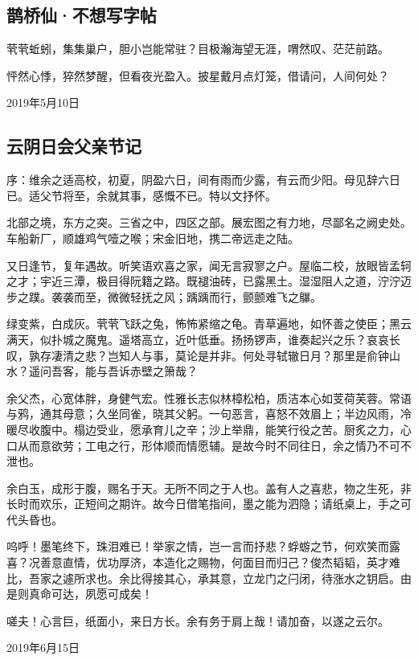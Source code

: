 \documentclass[a5paper]{ctexart}
\begin{document}
	\subsection{鹊桥仙·不想写字帖}
	茕茕蚯蚓，集集巢户，胆小岂能常驻？目极瀚海望无涯，喟然叹、茫茫前路。
	
	怦然心悸，猝然梦醒，但看夜光盈入。披星戴月点灯笼，借请问，人间何处？
	\begin{flushright}
		2019年5月10日 
	\end{flushright}
	
	\subsection{云阴日会父亲节记}
	\begin{small}
		序：维余之适高校，初夏，阴盈六日，间有雨而少露，有云而少阳。母见辞六日已。适父节将至，余就其事，感慨不已。特以文抒怀。
	\end{small}
	
	北部之境，东方之突。三省之中，四区之部。展宏图之有力地，尽鄙名之阙史处。车船新厂，顺雄鸡气噎之喉；宋金旧地，携二帝远走之陆。
	
	又日逢节，复年遇故。听笑语欢喜之家，闻无言寂寥之户。屋临二校，放眼皆孟轲之才；宇近三潭，极目得阮籍之路。既褪油砖，已露黑土。湿湿阻人之道，泞泞迈步之蹼。袭袭而至，微微轻抚之风；踽踽而行，颤颤难飞之鸔。
	
	绿变紫，白成灰。茕茕飞跃之兔，怖怖紧缩之龟。青草遍地，如怀善之使臣；黑云满天，似扑城之魔鬼。遥塔高立，近叶低垂。扬扬锣声，谁奏起兴之乐？哀哀长叹，孰存凄清之悲？岂知人与事，莫论是并非。何处寻轼辙日月？那里是俞钟山水？遥问吾客，能与吾诉赤壁之箫哉？
	
	余父杰，心宽体胖，身健气宏。性雅长志似林樟松柏，质洁本心如芰荷芙蓉。常语与鸦，通其母意；久坐同雀，晓其父躬。一句恶言，喜怒不效眉上；半边风雨，冷暖尽收腹中。榻边受业，愿承育儿之辛；沙上举鼎，能笑行役之苦。厨炙之力，心口从而意欲劳；工电之行，形体顺而情愿辅。是故今时不同往日，余之情乃不可不泄也。
	
	余白玉，成形于腹，赐名于天。无所不同之于人也。盖有人之喜悲，物之生死，非长时而欢乐，正短间之期许。故今日借笔指间，墨之能为泗隐；请纸桌上，手之可代头昏也。
	
	呜呼！墨笔终下，珠泪难已！举家之情，岂一言而抒悲？蜉蝣之节，何欢笑而露喜？况善意直情，优功厚济，本造化之赐物，何面目而归己？俊杰韬韬，英才难比，吾家之遽所求也。余比得接其心，承其意，立龙门之闩闭，待涨水之钥启。由是则真命可达，夙愿可成矣！
	
	嗟夫！心言巨，纸面小，来日方长。余有务于肩上哉！请加奋，以遂之云尔。
	\begin{flushright}
		2019年6月15日
	\end{flushright}
	
\end{document}

